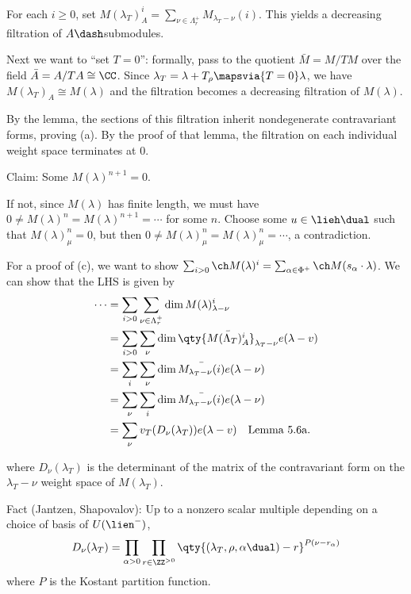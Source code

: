 For each \(i \geq 0\), set
\(M(\lambda_T)_A^i = \sum_{\nu \in \Lambda_r^+} M_{\lambda_T - \nu}(i)\).
This yields a decreasing filtration of \(A\dash\)submodules.

Next we want to ``set \(T=0\)'': formally, pass to the quotient
\(\bar M = M/TM\) over the field \(\bar A = A/TA \cong \CC\). Since
\(\lambda_T = \lambda + T_\rho \mapsvia{T = 0} \lambda\), we have
\(M(\lambda_T)_A \cong M(\lambda)\) and the filtration becomes a
decreasing filtration of \(M(\lambda)\).

By the lemma, the sections of this filtration inherit nondegenerate
contravariant forms, proving (a). By the proof of that lemma, the
filtration on each individual weight space terminates at 0.

Claim: Some \(M(\lambda)^{n+1} = 0\).

\begin{description}
\tightlist
\item[Proof]
If not, since \(M(\lambda)\) has finite length, we must have
\(0 \neq M(\lambda)^n = M(\lambda)^{n+1} = \cdots\) for some \(n\).
Choose some \(u\in \lieh\dual\) such that \(M(\lambda)_\mu^n = 0\), but
then \(0 \neq M(\lambda)_\mu^n = M(\lambda)_\mu^n = \cdots\), a
contradiction.
\end{description}

For a proof of (c), we want to show
\(\sum_{i > 0} \ch M(\lambda)^i = \sum_{\alpha \in \Phi^+} \ch M(s_\alpha \cdot \lambda)\).
We can show that the LHS is given by \begin{align*}
\cdots
&= \sum_{i > 0} \sum_{\nu \in \Lambda_r^+} \dim M(\lambda)_{\lambda-\nu}^i \\
&= \sum_{i > 0} \sum_\nu \dim\qty{\bar{M(\Lambda_T)_A^i}}_{\lambda_T - \nu} e(\lambda - v) \\
&= \sum_i \sum_\nu \dim \bar{M_{\lambda_T -\nu}(i)} e(\lambda - \nu) \\
&= \sum_\nu \sum_i \dim \bar{M_{\lambda_T -\nu}(i)} e(\lambda - \nu) \\
&= \sum_\nu v_T(D_\nu(\lambda_T)) e(\lambda - v) \quad\text{Lemma 5.6a}
.\end{align*}

where \(D_\nu(\lambda_T)\) is the determinant of the matrix of the
contravariant form on the \(\lambda_T - \nu\) weight space of
\(M(\lambda_T)\).

Fact (Jantzen, Shapovalov): Up to a nonzero scalar multiple depending on
a choice of basis of \(U(\lien^-)\), \begin{align*}
D_\nu(\lambda_T) = \prod_{\alpha > 0} \prod_{r \in \ZZ^{>0}} \qty{ (\lambda_T, \rho, \alpha\dual) - r  }^{P(\nu - r_\alpha)}
\end{align*} where \(P\) is the Kostant partition function.

